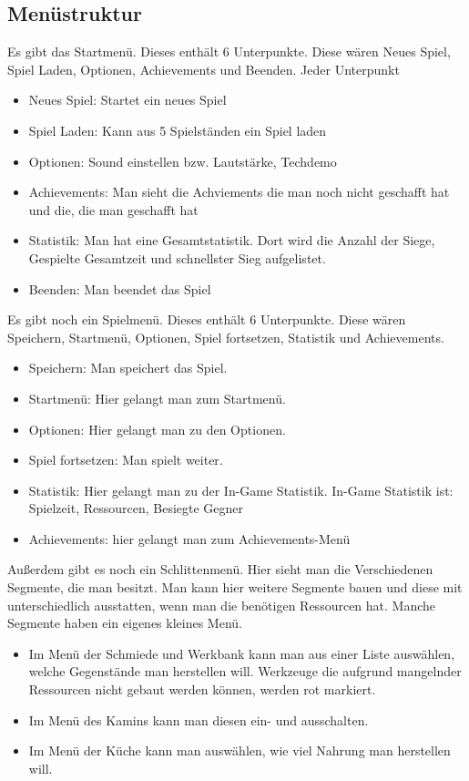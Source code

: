 \documentclass[a4paper,
  twoside, %
  headlines=2.1 %
  ]{scrartcl}
\begin{document}
	\subsection{Menüstruktur}
	Es gibt das Startmenü. Dieses enthält 6 Unterpunkte. Diese wären Neues Spiel, Spiel Laden, Optionen, Achievements und Beenden. Jeder Unterpunkt  
	\begin{itemize}
	    \item Neues Spiel: Startet ein neues Spiel
	    \item Spiel Laden: Kann aus 5 Spielständen ein Spiel laden
	    \item Optionen: Sound einstellen bzw. Lautstärke, Techdemo
	    \item Achievements: Man sieht die Achviements die man noch nicht geschafft hat und die, die man geschafft hat
	    \item Statistik: Man hat eine Gesamtstatistik. Dort wird die Anzahl der Siege, Gespielte Gesamtzeit und schnellster Sieg  aufgelistet.
	    \item Beenden: Man beendet das Spiel
	\end{itemize}
	Es gibt noch ein Spielmenü. Dieses enthält 6 Unterpunkte. Diese wären Speichern, Startmenü, Optionen, Spiel fortsetzen, Statistik und Achievements.
	\begin{itemize}
	    \item Speichern: Man speichert das Spiel.
	    \item Startmenü: Hier gelangt man zum Startmenü.
	    \item Optionen: Hier gelangt man zu den Optionen.
	    \item Spiel fortsetzen: Man spielt weiter.
	    \item Statistik: Hier gelangt man zu der In-Game Statistik. In-Game Statistik ist: Spielzeit, Ressourcen, Besiegte Gegner
	    \item Achievements: hier gelangt man zum Achievements-Menü
	\end{itemize}
	Außerdem gibt es noch ein Schlittenmenü. Hier sieht man die Verschiedenen Segmente, die man besitzt. Man kann hier weitere Segmente bauen und diese mit unterschiedlich ausstatten, wenn man die benötigen Ressourcen hat.
	Manche Segmente haben ein eigenes kleines Menü. 
	\begin{itemize}
	    \item Im Menü der Schmiede und Werkbank kann man aus einer Liste auswählen, welche Gegenstände man herstellen will. Werkzeuge die aufgrund mangelnder Ressourcen nicht gebaut werden können, werden rot markiert.
	    \item Im Menü des Kamins kann man diesen ein- und ausschalten.
	    \item Im Menü der Küche kann man auswählen, wie viel Nahrung man herstellen will.
	\end{itemize}
	
\end{document}
